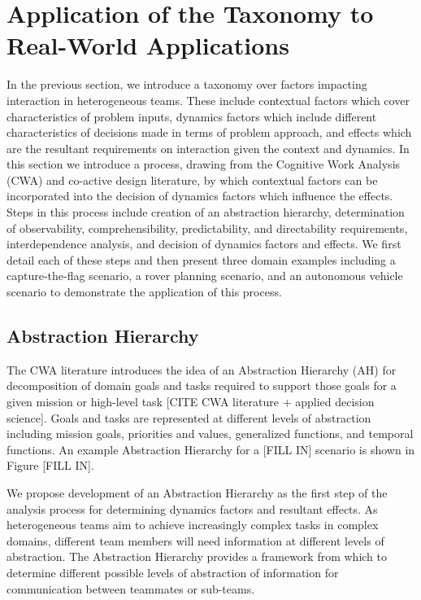 \documentclass[letterpaper, 10 pt, conference]{ieeeconf}  %
\theoremstyle{definition}
\begin{document}
\section{Application of the Taxonomy to Real-World Applications}
In the previous section, we introduce a taxonomy over factors impacting interaction in heterogeneous teams. These include contextual factors which cover characteristics of problem inputs, dynamics factors which include different characteristics of decisions made in terms of problem approach, and effects which are the resultant requirements on interaction given the context and dynamics. In this section we introduce a process, drawing from the Cognitive Work Analysis (CWA) and co-active design literature, by which contextual factors can be incorporated into the decision of dynamics factors which influence the effects. Steps in this process include creation of an abstraction hierarchy, determination of observability, comprehensibility, predictability, and directability requirements, interdependence analysis, and decision of dynamics factors and effects. We first detail each of these steps and then present three domain examples including a capture-the-flag scenario, a rover planning scenario, and an autonomous vehicle scenario to demonstrate the application of this process.

\subsection{Abstraction Hierarchy}
The CWA literature introduces the idea of an Abstraction Hierarchy (AH) for decomposition of domain goals and tasks required to support those goals for a given mission or high-level task [CITE CWA literature + applied decision science].  Goals and tasks are represented at different levels of abstraction including mission goals, priorities and values, generalized functions, and temporal functions. An example Abstraction Hierarchy for a [FILL IN] scenario is shown in Figure [FILL IN]. 

We propose development of an Abstraction Hierarchy as the first step of the analysis process for determining dynamics factors and resultant effects. As heterogeneous teams aim to achieve increasingly complex tasks in complex domains, different team members will need information at different levels of abstraction. The Abstraction Hierarchy provides a framework from which to determine different possible levels of abstraction of information for communication between teammates or sub-teams. 
\end{document}

